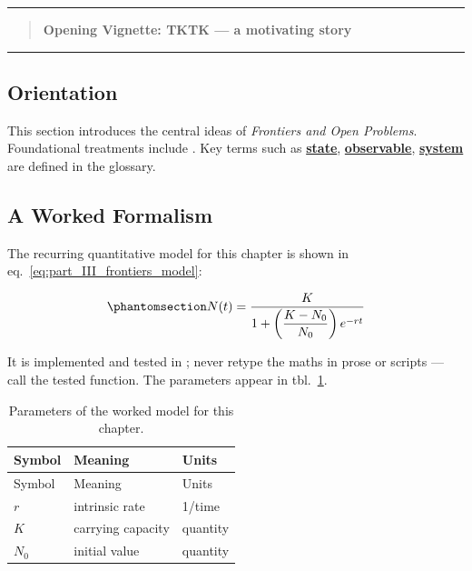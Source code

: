 \documentclass[
]{article}
\theoremstyle{plain}
\theoremstyle{definition}
\begin{document}
\begin{center}\rule{0.5\linewidth}{0.5pt}\end{center}

\begin{quote}
\textbf{Opening Vignette: TKTK --- a motivating story}
\end{quote}

\begin{center}\rule{0.5\linewidth}{0.5pt}\end{center}

\subsection{Orientation}\label{orientation-9}

This section introduces the central ideas of \emph{Frontiers and Open
Problems}. Foundational treatments include
\citep{wilson2021analysis, taylor2019theory}. Key terms such as
\hyperref[gl:state]{\textbf{state}},
\hyperref[gl:observable]{\textbf{observable}},
\hyperref[gl:system]{\textbf{system}} are defined in the glossary.

\subsection{A Worked Formalism}\label{a-worked-formalism-9}

The recurring quantitative model for this chapter is shown in
eq.~\ref{eq:part_III_frontiers_model}:

\begin{equation}\protect\phantomsection\label{eq:part_III_frontiers_model}{ N(t) = \frac{K}{1 + \left(\dfrac{K - N_0}{N_0}\right) e^{-rt}} }\end{equation}

It is implemented and tested in
; never retype the maths in
prose or scripts --- call the tested function. The parameters appear in
tbl.~\ref{tbl:part_III_frontiers_parameters}.

\begin{longtable}[]{@{}lll@{}}
\caption{Parameters of the worked model for this
chapter.}\label{tbl:part_III_frontiers_parameters}\tabularnewline
\toprule\noalign{}
Symbol & Meaning & Units \\
\midrule\noalign{}
\endfirsthead
\toprule\noalign{}
Symbol & Meaning & Units \\
\midrule\noalign{}
\endhead
\bottomrule\noalign{}
\endlastfoot
\(r\) & intrinsic rate & 1/time \\
\(K\) & carrying capacity & quantity \\
\(N_0\) & initial value & quantity \\
\end{longtable}
\end{document}

